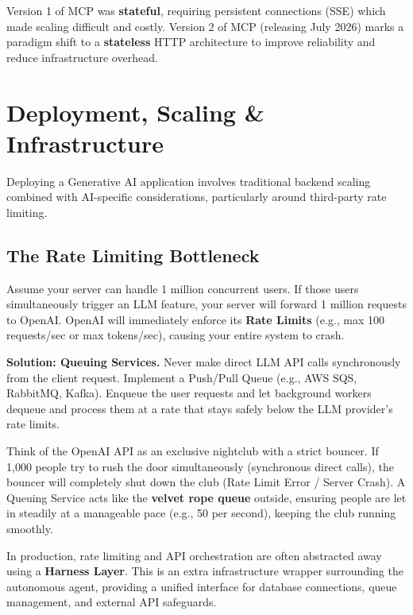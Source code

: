 \documentclass[12pt,a4paper,oneside]{book}
\begin{document}
\begin{warningbox}
	Version 1 of MCP was \textbf{stateful}, requiring persistent connections (SSE) which made scaling difficult and costly. Version 2 of MCP (releasing July 2026) marks a paradigm shift to a \textbf{stateless} HTTP architecture to improve reliability and reduce infrastructure overhead.
\end{warningbox}

\chapter{Deployment, Scaling \& Infrastructure}
Deploying a Generative AI application involves traditional backend scaling combined with AI-specific considerations, particularly around third-party rate limiting.

\section{The Rate Limiting Bottleneck}
Assume your server can handle 1 million concurrent users. If those users simultaneously trigger an LLM feature, your server will forward 1 million requests to OpenAI. OpenAI will immediately enforce its \textbf{Rate Limits} (e.g., max 100 requests/sec or max tokens/sec), causing your entire system to crash.

\begin{tipbox}
	\textbf{Solution: Queuing Services.} Never make direct LLM API calls synchronously from the client request. Implement a Push/Pull Queue (e.g., AWS SQS, RabbitMQ, Kafka). Enqueue the user requests and let background workers dequeue and process them at a rate that stays safely below the LLM provider's rate limits.
\end{tipbox}

\begin{tipbox}
	Think of the OpenAI API as an exclusive nightclub with a strict bouncer. If 1,000 people try to rush the door simultaneously (synchronous direct calls), the bouncer will completely shut down the club (Rate Limit Error / Server Crash). A Queuing Service acts like the \textbf{velvet rope queue} outside, ensuring people are let in steadily at a manageable pace (e.g., 50 per second), keeping the club running smoothly.
\end{tipbox}

\begin{infobox}
	In production, rate limiting and API orchestration are often abstracted away using a \textbf{Harness Layer}. This is an extra infrastructure wrapper surrounding the autonomous agent, providing a unified interface for database connections, queue management, and external API safeguards.
\end{infobox}
\end{document}
